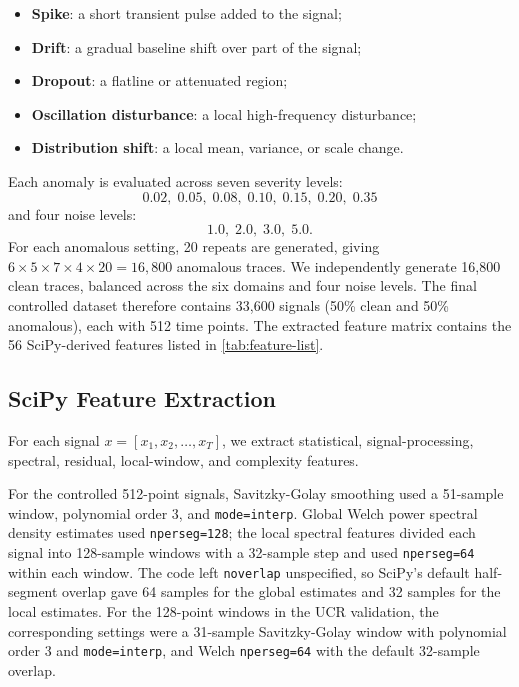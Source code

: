 \begin{itemize}
    \item \textbf{Spike}: a short transient pulse added to the signal;
    \item \textbf{Drift}: a gradual baseline shift over part of the signal;
    \item \textbf{Dropout}: a flatline or attenuated region;
    \item \textbf{Oscillation disturbance}: a local high-frequency disturbance;
    \item \textbf{Distribution shift}: a local mean, variance, or scale change.
\end{itemize}

Each anomaly is evaluated across seven severity levels:
\[
0.02,\; 0.05,\; 0.08,\; 0.10,\; 0.15,\; 0.20,\; 0.35
\]
and four noise levels:
\[
1.0,\; 2.0,\; 3.0,\; 5.0.
\]
For each anomalous setting, 20 repeats are generated, giving \(6 \times 5 \times 7 \times 4 \times 20 = 16{,}800\) anomalous traces. We independently generate 16,800 clean traces, balanced across the six domains and four noise levels. The final controlled dataset therefore contains 33,600 signals (50\% clean and 50\% anomalous), each with 512 time points. The extracted feature matrix contains the 56 SciPy-derived features listed in \cref{tab:feature-list}.

\subsection{SciPy Feature Extraction}

For each signal \(x = [x_1, x_2, \ldots, x_T]\), we extract statistical, signal-processing, spectral, residual, local-window, and complexity features.

For the controlled 512-point signals, Savitzky-Golay smoothing used a 51-sample window, polynomial order 3, and \texttt{mode=interp}. Global Welch power spectral density estimates used \texttt{nperseg=128}; the local spectral features divided each signal into 128-sample windows with a 32-sample step and used \texttt{nperseg=64} within each window. The code left \texttt{noverlap} unspecified, so SciPy's default half-segment overlap gave 64 samples for the global estimates and 32 samples for the local estimates. For the 128-point windows in the UCR validation, the corresponding settings were a 31-sample Savitzky-Golay window with polynomial order 3 and \texttt{mode=interp}, and Welch \texttt{nperseg=64} with the default 32-sample overlap.

